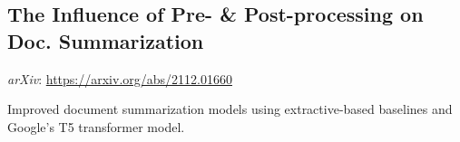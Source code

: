 \documentclass[11pt]{article}
\begin{document}
\subsection*{The Influence of Pre- \& Post-processing on Doc. Summarization \hfill {}}
\noindent
\textit{arXiv}: \href{https://arxiv.org/abs/2112.01660}{https://arxiv.org/abs/2112.01660}
\begin{asparaitem}
    \item Improved document summarization models using extractive-based baselines and Google's T5 transformer model.
\end{asparaitem}
\end{document}
